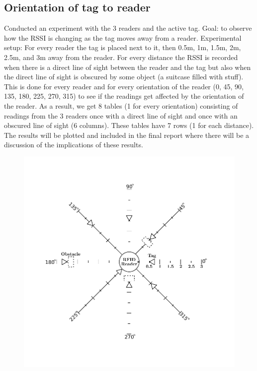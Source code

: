 \subsection{Orientation of tag to reader}

Conducted an experiment with the 3 readers and the active tag. Goal: to observe how the RSSI is changing as the tag moves away from a reader. Experimental setup: For every reader the tag is placed next to it, then 0.5m, 1m, 1.5m, 2m, 2.5m, and 3m away from the reader. For every distance the RSSI is recorded when there is a direct line of sight between the reader and the tag but also when the direct line of sight is obscured by some object (a suitcase filled with stuff). This is done for every reader and for every orientation of the reader (0, 45, 90, 135, 180, 225, 270, 315) to see if the readings get affected by the orientation of the reader. As a result, we get 8 tables (1 for every orientation) consisting of readings from the 3 readers once with a direct line of sight and once with an obscured line of sight (6 columns). These tables have 7 rows (1 for each distance). The results will be plotted and included in the final report where there will be a discussion of the implications of these results.

\begin{figure}[h]
	\begin{center}
		\includegraphics[width=.8\textwidth]{figures/exp/orientation}
		\caption{}
		\label{fig:ori}
	\end{center}
\end{figure}

